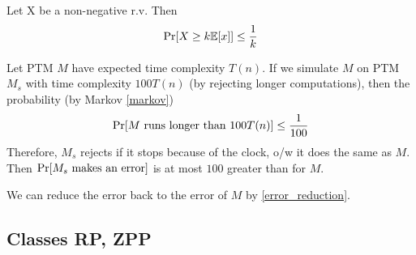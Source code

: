 \begin{theorem}\label{markov}
	Let X be a non-negative r.v. Then
	\[ \operatorname{Pr}[ X \geq k \mathbb{E}[x]] \leq \frac{1}{k} \]
\end{theorem}

\begin{observation}
	Let PTM $M$ have expected time complexity $T(n)$.
	If we simulate $M$ on PTM $M_s$ with time complexity $100 T(n)$ (by rejecting longer computations), then the probability (by Markov \cref{markov})
	\[ \operatorname{Pr}[M\ \text{runs longer than}\ 100 T(n)] \leq \frac{1}{100} \]
	Therefore, $M_s$ rejects if it stops because of the clock, o/w it does the same as $M$.
	Then $\operatorname{Pr}[M_s\ \text{makes an error}]$ is at most $100$ greater than for $M$.

	We can reduce the error back to the error of $M$ by \cref{error_reduction}.
\end{observation}

\subsection{Classes RP, ZPP}

